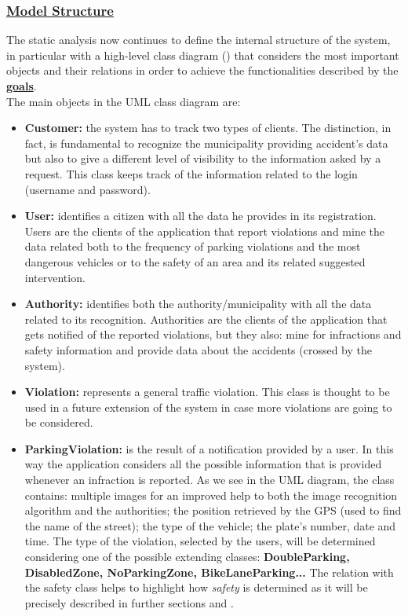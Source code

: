 	\subsubsection[Model Structure]{\hyperlink{toc}{Model Structure}}
	The static analysis now continues to define the internal structure of the system, in particular with a high-level class diagram () that considers the most important objects and their relations in order to achieve the functionalities described by the \hyperref[sec:goals]{\textbf{goals}}.\\
	
	The main objects in the UML class diagram are:
	\begin{itemize}
		\item \textbf{Customer:} the system has to track two types of clients. The distinction, in fact, is fundamental to recognize the municipality providing accident's data but also to give a different level of visibility to the information asked by a request. This class keeps track of the information related to the login (username and password).
		
		\item \textbf{User:} identifies a citizen with all the data he provides in its registration. Users are the clients of the application that report violations and mine the data related both to the frequency of parking violations and the most dangerous vehicles or to the safety of an area and its related suggested intervention.
		
		\item \textbf{Authority:} identifies both the authority/municipality with all the data related to its recognition. Authorities are the clients of the application that gets notified of the reported violations, but they also: mine for infractions and safety information and provide data about the accidents (crossed by the system).
		
		\item \textbf{Violation:} represents a general traffic violation. This class is thought to be used in a future extension of the system in case more violations are going to be considered.
		
		\item \textbf{ParkingViolation:} is the result of a notification provided by a user. In this way the application considers all the possible information that is provided whenever an infraction is reported. As we see in the UML diagram, the class contains: multiple images for an improved help to both the image recognition algorithm and the authorities; the position retrieved by the GPS (used to find the name of the street); the type of the vehicle; the plate's number, date and time. The type of the violation, selected by the users, will be determined considering one of the possible extending classes: \textbf{DoubleParking, DisabledZone, NoParkingZone, BikeLaneParking...} The relation with the safety class helps to highlight how \emph{safety} is determined as it will be precisely described in further sections  and .
		

\end{itemize}
